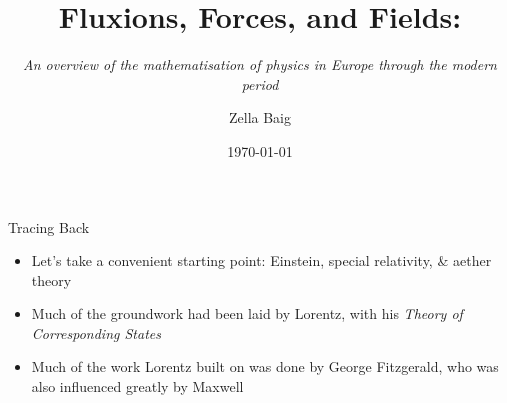 \documentclass{beamer}
\title{Fluxions, Forces, and Fields:}
\subtitle{\small \emph{An overview of the mathematisation of physics in Europe through the modern period}}
\date{\today}
\author{Zella Baig}
\begin{document}
\maketitle
  \begin{frame}{Tracing Back}
	\begin{itemize}
		\item Let's take a convenient starting point: Einstein, special relativity, \& aether theory
		\item Much of the groundwork had been laid by Lorentz, with his \emph{Theory of Corresponding States}{\autocite{specrel}}
	\item Much of the work Lorentz built on was done by George Fitzgerald, who was also influenced greatly by Maxwell
	\end{itemize}
  \end{frame}
\end{document}
